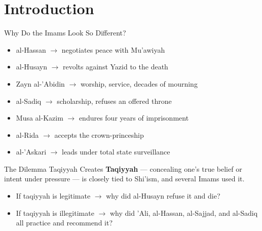\section{Introduction}


\begin{frame}{Why Do the Imams Look So Different?}
\begin{itemize}[itemsep=4pt]
  \item al-Hassan $\rightarrow$ negotiates peace with Mu'awiyah
  \item al-Husayn $\rightarrow$ revolts against Yazid to the death
  \item Zayn al-'Abidin $\rightarrow$ worship, service, decades of mourning
  \item al-Sadiq $\rightarrow$ scholarship, refuses an offered throne
  \item Musa al-Kazim $\rightarrow$ endures four years of imprisonment
  \item al-Rida $\rightarrow$ accepts the crown-princeship
  \item al-'Askari $\rightarrow$ leads under total state surveillance
\end{itemize}
\end{frame}

\begin{frame}{The Dilemma Taqiyyah Creates}
\textbf{Taqiyyah} --- concealing one's true belief or intent under pressure --- is closely tied to Shi'ism, and several Imams used it.
\begin{itemize}[itemsep=4pt]
  \item If taqiyyah is legitimate $\rightarrow$ why did al-Husayn refuse it and die?
  \item If taqiyyah is illegitimate $\rightarrow$ why did 'Ali, al-Hassan, al-Sajjad, and al-Sadiq all practice and recommend it?
\end{itemize}
\end{frame}

